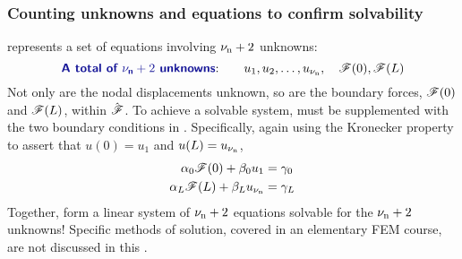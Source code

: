 \subsubsection{Counting unknowns and equations to confirm solvability}
 represents a set of \numnodes equations involving ${\nu_\text{n}}+2$ unknowns: 
\begin{equation}
 \text{\Defn{A total of $\numnodes+2$ unknowns}:}\qquad u_1, u_2, \ldots, u_\numnodes,\quad \tractionForce(0), \tractionForce(L)
\end{equation}
Not only are the nodal displacements unknown, so are the boundary forces, $\mathscr{F}(0)$ and $\mathscr{F}(L)$, within $\hat{\bm{\mathscr{F}}}$.  To achieve a solvable system,  must be supplemented with the two boundary conditions in .  Specifically, again using the Kronecker property to assert that $u(0)=u_1$ and $u(L)=u_{\nu_\text{n}}$,
\begin{equation}
\begin{aligned}
\alpha_0 \mathscr{F}(0)+\beta_0 u_1&=\gamma_0 \\
\alpha_L \mathscr{F}(L)+\beta_L u_{\nu_\text{n}}&=\gamma_L 
\end{aligned}
\label{eq:LinearBarStrongFormBCs}
\end{equation}
Together,  form a  linear system of ${\nu_\text{n}}+2$ equations solvable for the ${\nu_\text{n}}+2$ unknowns!  Specific methods of solution, covered in an elementary FEM course, are not discussed in this \manuscript.

